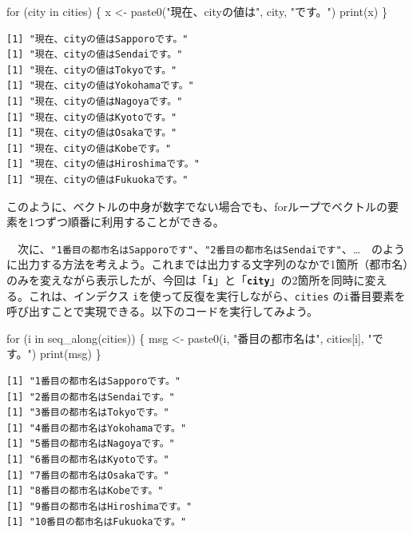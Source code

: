 \documentclass[
  a4paper,
  pandoc,
  ja=standard,
  jafont=haranoaji]{bxjsbook}
\newenvironment{Shaded}{\begin{snugshade}}{\end{snugshade}}
\newcommand{\ControlFlowTok}[1]{\textcolor[rgb]{0.00,0.48,0.65}{#1}}
\newcommand{\FunctionTok}[1]{\textcolor[rgb]{0.28,0.35,0.67}{#1}}
\newcommand{\NormalTok}[1]{\textcolor[rgb]{0.00,0.48,0.65}{#1}}
\newcommand{\OtherTok}[1]{\textcolor[rgb]{0.00,0.48,0.65}{#1}}
\newcommand{\StringTok}[1]{\textcolor[rgb]{0.13,0.47,0.30}{#1}}
\begin{document}
\begin{Shaded}
\begin{Highlighting}[numbers=left,,]
\ControlFlowTok{for}\NormalTok{ (city }\ControlFlowTok{in}\NormalTok{ cities) \{}
\NormalTok{  x }\OtherTok{\textless{}{-}} \FunctionTok{paste0}\NormalTok{(}\StringTok{"現在、cityの値は"}\NormalTok{, city, }\StringTok{"です。"}\NormalTok{)}
  \FunctionTok{print}\NormalTok{(x)}
\NormalTok{\}}
\end{Highlighting}
\end{Shaded}

\begin{verbatim}
[1] "現在、cityの値はSapporoです。"
[1] "現在、cityの値はSendaiです。"
[1] "現在、cityの値はTokyoです。"
[1] "現在、cityの値はYokohamaです。"
[1] "現在、cityの値はNagoyaです。"
[1] "現在、cityの値はKyotoです。"
[1] "現在、cityの値はOsakaです。"
[1] "現在、cityの値はKobeです。"
[1] "現在、cityの値はHiroshimaです。"
[1] "現在、cityの値はFukuokaです。"
\end{verbatim}

このように、ベクトルの中身が数字でない場合でも、forループでベクトルの要素を1つずつ順番に利用することができる。

　次に、\texttt{"1番目の都市名はSapporoです"}、\texttt{"2番目の都市名はSendaiです"}、\ldots{}　のように出力する方法を考えよう。これまでは出力する文字列のなかで1箇所（都市名）のみを変えながら表示したが、今回は「\textbf{\texttt{i}}」と「\textbf{\texttt{city}}」の2箇所を同時に変える。これは、インデクス
\texttt{i}を使って反復を実行しながら、\texttt{cities}
の\texttt{i}番目要素を呼び出すことで実現できる。以下のコードを実行してみよう。

\begin{Shaded}
\begin{Highlighting}[numbers=left,,]
\ControlFlowTok{for}\NormalTok{ (i }\ControlFlowTok{in} \FunctionTok{seq\_along}\NormalTok{(cities)) \{}
\NormalTok{  msg }\OtherTok{\textless{}{-}} \FunctionTok{paste0}\NormalTok{(i, }\StringTok{"番目の都市名は"}\NormalTok{, cities[i], }\StringTok{"です。"}\NormalTok{)}
  \FunctionTok{print}\NormalTok{(msg)}
\NormalTok{\}}
\end{Highlighting}
\end{Shaded}

\begin{verbatim}
[1] "1番目の都市名はSapporoです。"
[1] "2番目の都市名はSendaiです。"
[1] "3番目の都市名はTokyoです。"
[1] "4番目の都市名はYokohamaです。"
[1] "5番目の都市名はNagoyaです。"
[1] "6番目の都市名はKyotoです。"
[1] "7番目の都市名はOsakaです。"
[1] "8番目の都市名はKobeです。"
[1] "9番目の都市名はHiroshimaです。"
[1] "10番目の都市名はFukuokaです。"
\end{verbatim}
\end{document}
